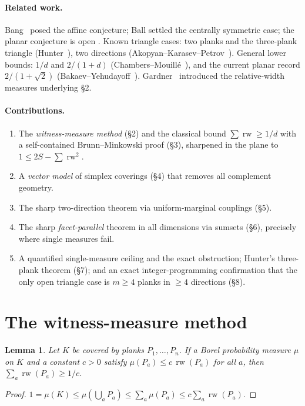 \documentclass[11pt]{article}
\theoremstyle{plain}
\newtheorem{lemma}[theorem]{Lemma}
\theoremstyle{remark}
\newcommand{\rw}{\operatorname{rw}}
\begin{document}
\paragraph{Related work.} Bang~\cite{bang1951} posed the affine conjecture; Ball
\cite{ball1991} settled the centrally symmetric case; the planar conjecture is open
\cite{verreault2022}. Known triangle cases: two planks and the three-plank triangle
(Hunter~\cite{hunter1993}), two directions (Akopyan--Karasev--Petrov~\cite{akp2019}).
General lower bounds: $1/d$ and $2/(1+d)$ (Chambers--Mouill\'e~\cite{chambers2016}),
and the current planar record $2/(1+\sqrt2)$ (Bakaev--Yehudayoff~\cite{by2026}).
Gardner~\cite{gardner1988} introduced the relative-width measures underlying \S2.

\paragraph{Contributions.}
\begin{enumerate}
\item The \emph{witness-measure method} (\S2) and the classical bound
$\sum\rw\ge1/d$ with a self-contained Brunn--Minkowski proof (\S3), sharpened in
the plane to $1\le 2S-\sum\rw^2$.
\item A \emph{vector model} of simplex coverings (\S4) that removes all
complement geometry.
\item The sharp two-direction theorem via uniform-marginal couplings (\S5).
\item The sharp \emph{facet-parallel} theorem in all dimensions via sumsets
(\S6), precisely where single measures fail.
\item A quantified single-measure ceiling and the exact obstruction; Hunter's
three-plank theorem (\S7); and an exact integer-programming confirmation that the
only open triangle case is $m\ge4$ planks in $\ge4$ directions (\S8).
\end{enumerate}

\section{The witness-measure method}

\begin{lemma}\label{lem:witness}
Let $K$ be covered by planks $P_1,\dots,P_n$. If a Borel probability measure
$\mu$ on $K$ and a constant $c>0$ satisfy $\mu(P_a)\le c\,\rw(P_a)$ for all $a$,
then $\sum_a\rw(P_a)\ge 1/c$.
\end{lemma}
\begin{proof}
$1=\mu(K)\le\mu\!\left(\bigcup_a P_a\right)\le\sum_a\mu(P_a)\le c\sum_a\rw(P_a)$.
\end{proof}
\end{document}

